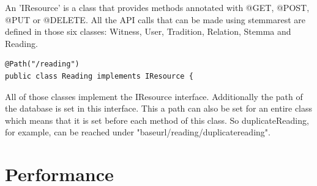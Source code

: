 \documentclass[11pt,fleqn,openany]{book} %
\begin{document}
An 'IResource' is a class that provides methods annotated with @GET, @POST, @PUT or @DELETE. All the API calls that can be made using stemmarest are defined in those six classes: Witness, User, Tradition, Relation, Stemma and Reading.
\\

\begin{lstlisting}
@Path("/reading")
public class Reading implements IResource {
\end{lstlisting}

All of those classes implement the IResource interface. Additionally the path of the database is set in this interface. This a path can also be set for an entire class which means that it is set before each method of this class. So duplicateReading, for example, can be reached under "baseurl/reading/duplicatereading".




\chapter{Performance}
\end{document}
